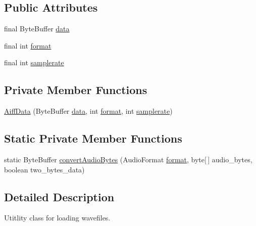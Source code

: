\subsection*{Public Attributes}
\begin{DoxyCompactItemize}
\item 
final Byte\+Buffer \mbox{\hyperlink{classorg_1_1newdawn_1_1slick_1_1openal_1_1_aiff_data_a02d81a81b398f83b4aed171704a37e36}{data}}
\item 
final int \mbox{\hyperlink{classorg_1_1newdawn_1_1slick_1_1openal_1_1_aiff_data_a54e467ab61d7d0e34cb273fd0b4b0779}{format}}
\item 
final int \mbox{\hyperlink{classorg_1_1newdawn_1_1slick_1_1openal_1_1_aiff_data_adef9190479e5b91bca445853c8d3de77}{samplerate}}
\end{DoxyCompactItemize}
\subsection*{Private Member Functions}
\begin{DoxyCompactItemize}
\item 
\mbox{\hyperlink{classorg_1_1newdawn_1_1slick_1_1openal_1_1_aiff_data_a55631a1053adb8e9a8a8ce4751b30685}{Aiff\+Data}} (Byte\+Buffer \mbox{\hyperlink{classorg_1_1newdawn_1_1slick_1_1openal_1_1_aiff_data_a02d81a81b398f83b4aed171704a37e36}{data}}, int \mbox{\hyperlink{classorg_1_1newdawn_1_1slick_1_1openal_1_1_aiff_data_a54e467ab61d7d0e34cb273fd0b4b0779}{format}}, int \mbox{\hyperlink{classorg_1_1newdawn_1_1slick_1_1openal_1_1_aiff_data_adef9190479e5b91bca445853c8d3de77}{samplerate}})
\end{DoxyCompactItemize}
\subsection*{Static Private Member Functions}
\begin{DoxyCompactItemize}
\item 
static Byte\+Buffer \mbox{\hyperlink{classorg_1_1newdawn_1_1slick_1_1openal_1_1_aiff_data_a00be2b6b6b5817dfe4fb37eab2aac619}{convert\+Audio\+Bytes}} (Audio\+Format \mbox{\hyperlink{classorg_1_1newdawn_1_1slick_1_1openal_1_1_aiff_data_a54e467ab61d7d0e34cb273fd0b4b0779}{format}}, byte\mbox{[}$\,$\mbox{]} audio\+\_\+bytes, boolean two\+\_\+bytes\+\_\+data)
\end{DoxyCompactItemize}


\subsection{Detailed Description}
Utitlity class for loading wavefiles.

